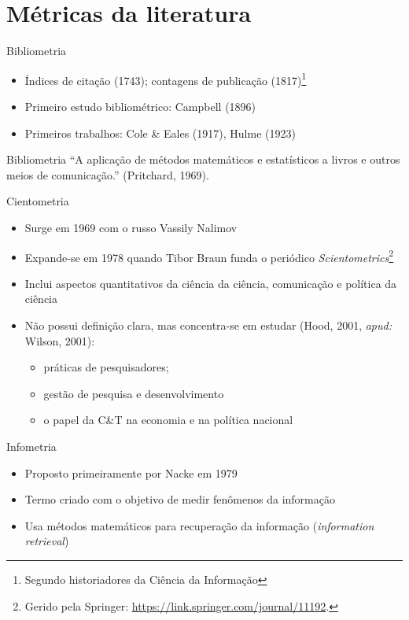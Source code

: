 \section{Métricas da literatura}

\begin{frame}{Bibliometria}
\begin{itemize}
\item Índices de citação (1743); contagens de publicação (1817)\footnote{Segundo historiadores da Ciência da Informação}
\item Primeiro estudo bibliométrico: Campbell (1896)
\item Primeiros trabalhos: Cole \& Eales (1917), Hulme (1923)
\end{itemize}
\begin{block}{Bibliometria}
``A aplicação de métodos matemáticos e estatísticos a livros e outros meios de comunicação.''
(Pritchard, 1969).
\end{block}
\end{frame}

\begin{frame}{Cientometria}
\begin{itemize}
\item Surge em 1969 com o russo Vassily Nalimov
\item Expande-se em 1978 quando Tibor Braun funda o periódico \textit{Scientometrics}\footnote{Gerido pela Springer:
 \url{https://link.springer.com/journal/11192}.}
\item Inclui aspectos quantitativos da ciência da ciência, comunicação e política da ciência
\item Não possui definição clara, mas concentra-se em estudar (Hood, 2001, \emph{apud:} Wilson, 2001): 
\begin{itemize}
\item práticas de pesquisadores;
\item gestão de pesquisa e desenvolvimento
\item o papel da C{\&}T na economia e na política nacional 
\end{itemize}
\end{itemize}
\end{frame}

\begin{frame}{Infometria} 
\begin{itemize}
\item Proposto primeiramente por Nacke em 1979
\item Termo criado com o objetivo de medir fenômenos da informação
\item Usa métodos matemáticos para recuperação da informação (\textit{information retrieval})
\end{itemize}
\end{frame}


